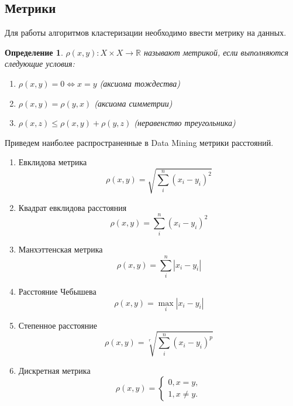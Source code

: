 \documentclass[a4paper]{article}
\newtheorem{definition}{Определение}
\begin{document}
\subsection{Метрики}
Для работы алгоритмов кластеризации необходимо ввести метрику на данных.
\begin{definition}
	$\rho(x, y): X \times X \rightarrow \mathbb {R}$ называют метрикой, если выполняются следующие условия:
	\begin{enumerate} 
		\item
		$\rho(x, y) = 0 \Leftrightarrow x = y$ (аксиома тождества)
		\item
		$\rho(x, y) = \rho(y, x)$ (аксиома симметрии)
		\item
		$\rho(x, z) \leq \rho(x, y) + \rho(y, z)$ (неравенство треугольника)
	\end{enumerate}
\end{definition}
Приведем наиболее распространенные в Data Mining метрики расстояний.
\begin{enumerate} 
	\item Евклидова метрика
	\begin{equation}
	\rho(x, y) = \sqrt{\sum\limits_{i}^n (x_i - y_i)^2}
	\end{equation}
	\item Квадрат евклидова расстояния
	\begin{equation}
	\rho(x, y) = \sum\limits_{i}^n (x_i - y_i)^2
	\end{equation}
	\item Манхэттенская метрика
	\begin{equation}
	\rho(x, y) = \sum\limits_{i}^n |x_i - y_i|
	\end{equation}
	\item Расстояние Чебышева
	\begin{equation}
	\rho(x, y) = \max_i|x_i - y_i|
	\end{equation}
	\item Степенное расстояние
	\begin{equation}
	\rho(x, y) = \sqrt[r]{\sum\limits_{i}^n (x_i - y_i)^p}
	\end{equation}
	\item Дискретная метрика
	\begin{equation}
	\rho(x, y) = 
	\begin{cases}
	0, x = y,
	\\
	1, x \neq y.
	\end{cases}
	\end{equation}
\end{enumerate} 
\end{document}
